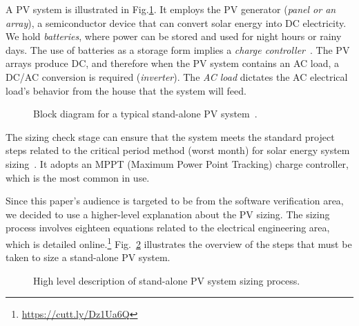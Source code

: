 \documentclass[journal]{IEEEtran}
\begin{document}
A PV system is illustrated in Fig.\ref{fig:blockdiagram}. It employs the PV generator (\textit{panel or an array}), a semiconductor device that can convert solar energy into DC electricity. We hold \textit{batteries}, where power can be stored and used for night hours or rainy days. The use of batteries as a storage form implies a \textit{charge controller}~\cite{Hansen}. The PV arrays produce DC, and therefore when the PV system contains an AC load, a DC/AC conversion is required (\textit{inverter}). The \textit{AC load} dictates the AC electrical load's behavior from the house that the system will feed.
%
\begin{figure}[ht]
\centering
\caption{Block diagram for a typical stand-alone PV system~\cite{Hansen}.}
\label{fig:blockdiagram} 
\end{figure}

The sizing check stage can ensure that the system meets the standard project steps related to the critical period method (worst month) for solar energy system sizing~\cite{Pinho}. It adopts an MPPT (Maximum Power Point Tracking) charge controller, which is the most common in use. 

Since this paper's audience is targeted to be from the software verification area, we decided to use a higher-level explanation about the PV sizing. The sizing process involves eighteen equations related to the electrical engineering area, which is detailed online.\footnote{\href{https://cutt.ly/Dz1Ua6Q}{https://cutt.ly/Dz1Ua6Q}} 
Fig.~\ref{fig:flow} illustrates the overview of the steps that must be taken to size a stand-alone PV system.
%
\begin{figure}[ht]
\centering
\caption{High level description of stand-alone PV system sizing process.}
\label{fig:flow} 
\end{figure}
\end{document}
